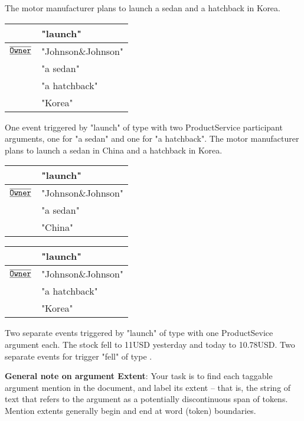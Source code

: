 \begin{exe}
    \ex The motor manufacturer plans to launch a sedan and a hatchback in Korea.
        \expl \begin{tabular}{|L{6cm}|L{7cm}|} \hline
             & "launch" \\\hline
            $\overline{\underline{\texttt{Owner}}}$ & "Johnson\&Johnson" \\
             & "a sedan" \\
             & "a hatchback" \\
             & "Korea" \\\hline \end{tabular}
    \expl One event triggered by "launch" of type  with two ProductService participant arguments, one for "a sedan" and one for "a hatchback".
    \ex The motor manufacturer plans to launch a sedan in China and a hatchback in Korea.
        \expl \begin{tabular}{|L{6cm}|L{7cm}|} \hline
             & "launch" \\\hline
            $\overline{\underline{\texttt{Owner}}}$ & "Johnson\&Johnson" \\
             & "a sedan" \\
             & "China" \\\hline \end{tabular}
        \expl \begin{tabular}{|L{6cm}|L{7cm}|} \hline
             & "launch" \\\hline
            $\overline{\underline{\texttt{Owner}}}$ & "Johnson\&Johnson" \\
             & "a hatchback" \\
             & "Korea" \\\hline \end{tabular}
        \expl Two separate events triggered by "launch" of type  with one ProductSevice argument each.
    \ex The stock fell to 11USD yesterday and today to 10.78USD.
        \expl Two separate events for trigger "fell" of type .
\end{exe}

\textbf{General note on argument Extent}:
Your task is to find each taggable argument mention in the document, and label its extent – that is, the string of text that refers to the argument as a potentially discontinuous span of tokens.
Mention extents generally begin and end at word (token) boundaries.

